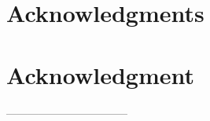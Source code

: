 \documentclass[conference,compsoc]{IEEEtran}
\begin{document}
%
\IEEEpeerreviewmaketitle





\ifCLASSOPTIONcompsoc
  \section*{Acknowledgments}
\else
  \section*{Acknowledgment}
\fi

---------------------------------





\end{document}
